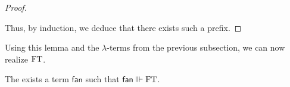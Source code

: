 \documentclass[a4paper,UKenglish,cleveref, autoref, thm-restate]{lipics-v2021}
\begin{document}
\begin{proof}
\begin{itemize}
    
    
    
  \end{itemize}

  Thus, by induction, we deduce that there exists such a prefix.
\end{proof}

Using this lemma and the $\lambda$-terms from the previous subsection, we can now realize $\mathrm{FT}$.

\begin{theorem}\label{thm:FT}
   The exists a term $\mathsf{fan}$ such that $\mathsf{fan}\Vvdash \mathrm{FT}$.
\end{theorem}
\end{document}
